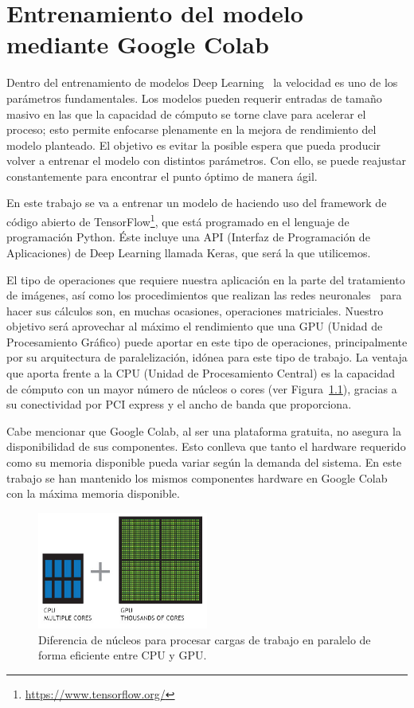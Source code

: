 \mbox{}


\chapter{Entrenamiento del modelo mediante Google Colab}
\label{ch:chapter2}
Dentro del entrenamiento de modelos Deep Learning~\cite{advanced_convolutional_network} la velocidad es uno de los parámetros fundamentales.
Los modelos pueden requerir entradas de tamaño masivo en las que la capacidad de cómputo se torne clave para acelerar el proceso;
esto permite enfocarse plenamente en la mejora de rendimiento del modelo planteado.
El objetivo es evitar la posible espera que pueda producir volver a entrenar el modelo con distintos parámetros.
Con ello, se puede reajustar constantemente para encontrar el punto óptimo de manera ágil.

En este trabajo se va a entrenar un modelo de  haciendo uso del framework de código abierto de TensorFlow\footnote{\url{https://www.tensorflow.org/}}, que está programado en el lenguaje de programación Python.
Éste incluye una API (Interfaz de Programación de Aplicaciones) de Deep Learning llamada Keras, que será la que utilicemos.

El tipo de operaciones que requiere nuestra aplicación en la parte del tratamiento de imágenes, así como los procedimientos que realizan las redes neuronales~\cite{neural_network} para hacer sus cálculos son, en muchas ocasiones, operaciones matriciales. Nuestro objetivo será aprovechar al máximo el rendimiento que una GPU (Unidad de Procesamiento Gráfico) puede aportar en este tipo de operaciones, principalmente por su arquitectura de paralelización, idónea para este tipo de trabajo.
La ventaja que aporta frente a la CPU (Unidad de Procesamiento Central) es la capacidad de cómputo con un mayor número de núcleos o cores (ver Figura~\ref{fig:Arquitectura de paralelización de una GPU}), gracias a su conectividad por PCI express y el ancho de banda que proporciona.

Cabe mencionar que Google Colab, al ser una plataforma gratuita, no asegura la disponibilidad de sus componentes.
Esto conlleva que tanto el hardware requerido como su memoria disponible pueda variar según la demanda del sistema.
En este trabajo se han mantenido los mismos componentes hardware en Google Colab con la máxima memoria disponible.
\begin{figure}[h]
    \centering
    \includegraphics[width=0.5\textwidth]{images/chapter2/cpu-and-gpu.jpg}
    \caption{Diferencia de núcleos para procesar cargas de trabajo en paralelo de forma eficiente entre CPU y GPU.}
    \label{fig:Arquitectura de paralelización de una GPU}
\end{figure}


